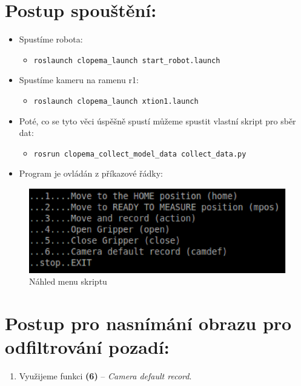 \documentclass[10pt,a4paper,titlepage,oneside]{report}
\begin{document}
\section{Postup spouštění:}

\begin{itemize}
  \item Spustíme robota: 
  \begin{itemize} 
  
  	\item \verb|roslaunch clopema_launch start_robot.launch|
  \end{itemize}
  
  \item Spustíme kameru na ramenu r1:
  \begin{itemize}
  	\item \verb|roslaunch clopema_launch xtion1.launch|
  \end{itemize}
  
  \item Poté, co se tyto věci úspěšně spustí můžeme spustit vlastní skript pro sběr dat:
  \begin{itemize}
  	\item \verb|rosrun clopema_collect_model_data collect_data.py|
  \end{itemize}
  
  \item Program je ovládán z příkazové řádky:
  
\end{itemize}

\begin{figure}[H]
	\centering  	
  	\includegraphics[scale=0.6]{pictures/obrazek3.eps}
  	\caption{Náhled menu skriptu}
  	\label{fig:obrazek3}
\end{figure}

\section{Postup pro nasnímání obrazu pro odfiltrování pozadí:}
\begin{enumerate}
  \item Využijeme funkci \textbf{(6)} – \textit{Camera default record}.
\end{enumerate}
\end{document}
